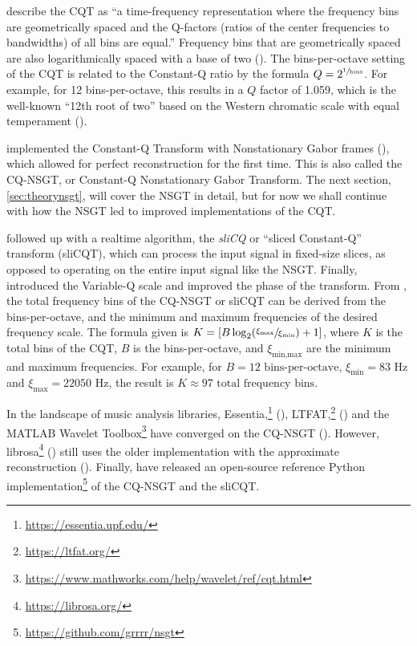 \documentclass[report.tex]{subfiles}
\begin{document}
\textcite{klapuricqt} describe the CQT as ``a time-frequency representation where the frequency bins are geometrically spaced and the Q-factors (ratios of the center frequencies to bandwidths) of all bins are equal.'' Frequency bins that are geometrically spaced are also logarithmically spaced with a base of two (\cite{geometriclog}). The bins-per-octave setting of the CQT is related to the Constant-Q ratio by the formula $Q = 2^{\sfrac{1}{\text{bins}}}$. For example, for 12 bins-per-octave, this results in a $Q$ factor of 1.059, which is the well-known ``12th root of two'' based on the Western chromatic scale with equal temperament (\cite{westernpitch1, westernpitch2}).

\textcite{invertiblecqt} implemented the Constant-Q Transform with Nonstationary Gabor frames (\cite{balazs}), which allowed for perfect reconstruction for the first time. This is also called the CQ-NSGT, or Constant-Q Nonstationary Gabor Transform. The next section, \ref{sec:theorynsgt}, will cover the NSGT in detail, but for now we shall continue with how the NSGT led to improved implementations of the CQT.

\textcite{slicq} followed up with a realtime algorithm, the \textit{sliCQ} or ``sliced Constant-Q'' transform (sliCQT), which can process the input signal in fixed-size slices, as opposed to operating on the entire input signal like the NSGT. Finally, \textcite{variableq1} introduced the Variable-Q scale and improved the phase of the transform. From \textcite{invertiblecqt}, the total frequency bins of the CQ-NSGT or sliCQT can be derived from the bins-per-octave, and the minimum and maximum frequencies of the desired frequency scale. The formula given is $K = [B \log_{2}(\sfrac{\xi_{\text{max}}}{\xi_{\text{min}}}) + 1]$, where $K$ is the total bins of the CQT, $B$ is the bins-per-octave, and $\xi_{\text{min,max}}$ are the minimum and maximum frequencies. For example, for $B = 12 \text{ bins-per-octave}$, $\xi_{\text{min}} = 83 \text{ Hz}$ and $\xi_{\text{max}} = 22050 \text{ Hz}$, the result is $K \approx 97 \text{ total frequency bins}$.

In the landscape of music analysis libraries, Essentia,\footnote{\url{https://essentia.upf.edu/}} (\cite{essentia}), LTFAT,\footnote{\url{https://ltfat.org/}} (\cite{ltfat}) and the MATLAB Wavelet Toolbox\footnote{\url{https://www.mathworks.com/help/wavelet/ref/cqt.html}} have converged on the CQ-NSGT (\cite{invertiblecqt, slicq, variableq1}). However, librosa\footnote{\url{https://librosa.org/}} (\cite{librosa}) still uses the older implementation with the approximate reconstruction (\cite{klapuricqt}). Finally, \textcite{invertiblecqt} have released an open-source reference Python implementation\footnote{\url{https://github.com/grrrr/nsgt}} of the CQ-NSGT and the sliCQT.
\end{document}
